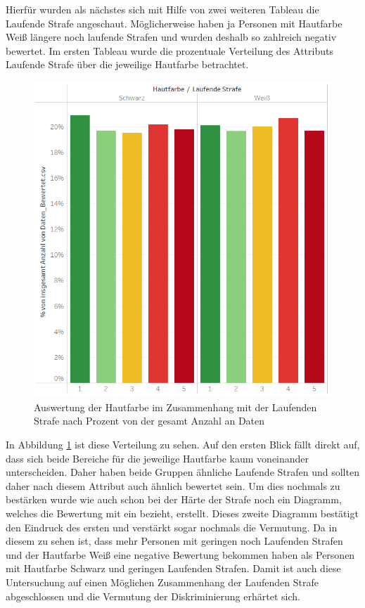 \begin{onehalfspace}
Hierfür wurden als nächstes sich mit Hilfe von zwei weiteren Tableau die Laufende Strafe angeschaut. Möglicherweise haben ja Personen mit Hautfarbe Wei{\ss} längere noch laufende Strafen und wurden deshalb so zahlreich negativ bewertet. Im ersten Tableau wurde die prozentuale Verteilung des Attributs Laufende Strafe über die jeweilige Hautfarbe betrachtet.
\begin{figure}[h]
    \centering
    \includegraphics{Diagramme/Tab_Haut3.PNG}
    \caption{Auswertung der Hautfarbe im Zusammenhang mit der Laufenden Strafe nach Prozent von der gesamt Anzahl an Daten}
    \label{fig:TabHaut3}
\end{figure}
In Abbildung \ref{fig:TabHaut3} ist diese Verteilung zu sehen. Auf den ersten Blick fällt direkt auf, dass sich beide Bereiche für die jeweilige Hautfarbe kaum voneinander unterscheiden. Daher haben beide Gruppen ähnliche Laufende Strafen und sollten daher nach diesem Attribut auch ähnlich bewertet sein. Um dies nochmals zu bestärken wurde wie auch schon bei der Härte der Strafe noch ein Diagramm, welches die Bewertung mit ein bezieht, erstellt. Dieses zweite Diagramm bestätigt den Eindruck des ersten und verstärkt sogar nochmals die Vermutung. Da in diesem zu sehen ist, dass mehr Personen mit geringen noch Laufenden Strafen und der Hautfarbe Wei{\ss} eine negative Bewertung bekommen haben als Personen mit Hautfarbe Schwarz und geringen Laufenden Strafen. Damit ist auch diese Untersuchung auf einen Möglichen Zusammenhang der Laufenden Strafe abgeschlossen und die Vermutung der Diskriminierung erhärtet sich.\\

\end{onehalfspace}
